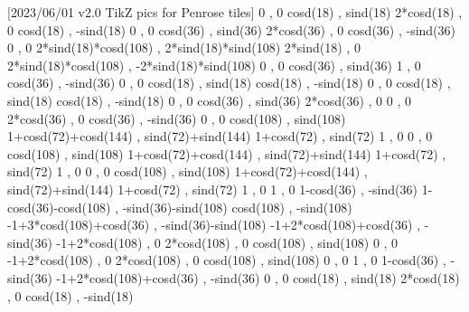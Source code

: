 \RequirePackage{tikz}
\usetikzlibrary{tilings}
[2023/06/01 v2.0 TikZ pics for Penrose tiles]
{
 {0 , 0}
 {cosd(18) , sind(18)}
 {2*cosd(18) , 0}
 {cosd(18) , -sind(18)}
}
{
 {0 , 0}
 {cosd(36) , sind(36)}
 {2*cosd(36) , 0}
 {cosd(36) , -sind(36)}
}
{
 {0 , 0}
 {2*sind(18)*cosd(108) , 2*sind(18)*sind(108)}
 {2*sind(18) , 0}
 {2*sind(18)*cosd(108) , -2*sind(18)*sind(108)}
}
{
 {0 , 0}
 {cosd(36) , sind(36)}
 {1 , 0}
 {cosd(36) , -sind(36)}
}
{
 {0 , 0}
 {cosd(18) , sind(18)}
 {cosd(18) , -sind(18)}
}
{
 {0 , 0}
 {cosd(18) , sind(18)}
 {cosd(18) , -sind(18)}
}
{
 {0 , 0}
 {cosd(36) , sind(36)}
 {2*cosd(36) , 0}
}
{
 {0 , 0}
 {2*cosd(36) , 0}
 {cosd(36) , -sind(36)}
}
{
 {0 , 0}
 {cosd(108) , sind(108)}
 {1+cosd(72)+cosd(144) , sind(72)+sind(144)}
 {1+cosd(72) , sind(72)}
 {1 , 0}
}
{
 {0 , 0}
 {cosd(108) , sind(108)}
 {1+cosd(72)+cosd(144) , sind(72)+sind(144)}
 {1+cosd(72) , sind(72)}
 {1 , 0}
}
{
 {0 , 0}
 {cosd(108) , sind(108)}
 {1+cosd(72)+cosd(144) , sind(72)+sind(144)}
 {1+cosd(72) , sind(72)}
 {1 , 0}
}
{
  {1 , 0}
  {1-cosd(36) , -sind(36)}
  {1-cosd(36)-cosd(108) , -sind(36)-sind(108)}
  {cosd(108) , -sind(108)}
  {-1+3*cosd(108)+cosd(36) , -sind(36)-sind(108)}
  {-1+2*cosd(108)+cosd(36) , -sind(36)}
  {-1+2*cosd(108) , 0}
  {2*cosd(108) , 0}
  {cosd(108) , sind(108)}
  {0 , 0}
}
{
 {-1+2*cosd(108) , 0}
 {2*cosd(108) , 0}
 {cosd(108) , sind(108)}
 {0 , 0}
 {1 , 0}
 {1-cosd(36) , -sind(36)}
 {-1+2*cosd(108)+cosd(36) , -sind(36)}
}
{
 {0 , 0}
 {cosd(18) , sind(18)}
 {2*cosd(18) , 0}
 {cosd(18) , -sind(18)}
}
